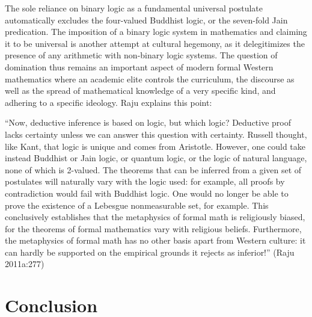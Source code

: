 The sole reliance on binary logic as a fundamental universal postulate automatically excludes the four-valued Buddhist logic, or the seven-fold Jain predication. The imposition of a binary logic system in mathematics and claiming it to be universal is another attempt at cultural hegemony, as it delegitimizes the presence of any arithmetic with non-binary logic systems. The question of domination thus remains an important aspect of modern formal Western mathematics where an academic elite controls the curriculum, the discourse as well as the spread of mathematical knowledge of a very specific kind, and adhering to a specific ideology. Raju explains this point: 
\begin{myquote}
``Now, deductive inference is based on logic, but which logic? Deductive proof lacks certainty unless we can answer this question with certainty. Russell thought, like Kant, that logic is unique and comes from Aristotle. However, one could take instead Buddhist or Jain logic, or quantum logic, or the logic of natural language, none of which is 2-valued. The theorems that can be inferred from a given set of postulates will naturally vary with the logic used: for example, all proofs by contradiction would fail with Buddhist logic. One would no longer be able to prove the existence of a Lebesgue nonmeasurable set, for example. This conclusively establishes that the metaphysics of formal math is religiously biased, for the theorems of formal mathematics vary with religious beliefs. Furthermore, the metaphysics of formal math has no other basis apart from Western culture: it can hardly be supported on the empirical grounds it rejects as inferior!''
\hfill (Raju 2011a:277)
\end{myquote}

\medskip

\section*{Conclusion}


